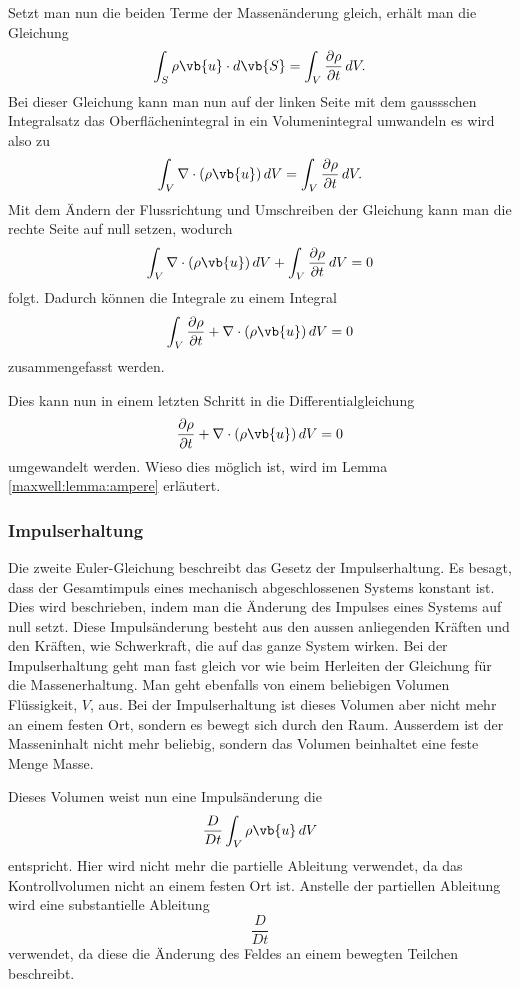 Setzt man nun die beiden Terme der Massenänderung gleich, erhält man die Gleichung 
\[\int_{S}\rho\vb{u}\cdot d\vb{S} 
=
\int_{V} \frac{\partial \rho}{\partial t} \, dV .\] 
Bei dieser Gleichung kann man nun auf der linken Seite mit dem gaussschen Integralsatz das Oberflächenintegral in ein Volumenintegral umwandeln es wird also zu
\[\int_{V}\nabla\cdot(\rho\vb{u}) \, dV
=
\int_{V}\frac{\partial \rho}{\partial t}  \, dV .\]
Mit dem Ändern der Flussrichtung und Umschreiben der Gleichung kann man die rechte Seite auf null setzen, wodurch 
\[\int_{V}\nabla\cdot(\rho\vb{u})  \, dV + \int_{V}\frac{\partial \rho}{\partial t}  \, dV 
= 
0\] 
folgt.
Dadurch können die Integrale zu einem Integral
\[\int_{V} \frac{\partial \rho}{\partial t} + \nabla\cdot(\rho\vb{u})  \, dV 
= 
0\]
zusammengefasst werden.

Dies kann nun in einem letzten Schritt in die Differentialgleichung
\begin{equation}
\label{openfoam:euler1}
\frac{\partial \rho}{\partial t} + \nabla\cdot(\rho\vb{u})  \, dV 
= 
0
\end{equation}
umgewandelt werden.
Wieso dies möglich ist, wird im Lemma \ref{maxwell:lemma:ampere} erläutert.

\subsubsection{Impulserhaltung}
Die zweite Euler-Gleichung beschreibt das Gesetz der Impulserhaltung. 
Es besagt, dass der Gesamtimpuls eines mechanisch abgeschlossenen Systems konstant ist.
Dies wird beschrieben, indem man die Änderung des Impulses eines Systems auf null setzt.
Diese Impulsänderung besteht aus den aussen anliegenden Kräften und den Kräften, wie Schwerkraft, die auf das ganze System wirken.
Bei der Impulserhaltung geht man fast gleich vor wie beim Herleiten der Gleichung für die Massenerhaltung.
Man geht ebenfalls von einem beliebigen Volumen Flüssigkeit, $V$, aus.
Bei der Impulserhaltung ist dieses Volumen aber nicht mehr an einem festen Ort, sondern es bewegt sich durch den Raum.
Ausserdem ist der Masseninhalt nicht mehr beliebig, sondern das Volumen beinhaltet eine feste Menge Masse.

Dieses Volumen weist nun eine Impulsänderung die
\[\frac{D}{Dt}\int_{V}\rho\vb{u}\, dV\]
entspricht.
Hier wird nicht mehr die partielle Ableitung verwendet, da das Kontrollvolumen nicht an einem festen Ort ist.
Anstelle der partiellen Ableitung wird eine substantielle Ableitung \[\frac{D}{Dt}\] verwendet, da diese die Änderung des Feldes an einem bewegten Teilchen beschreibt.

